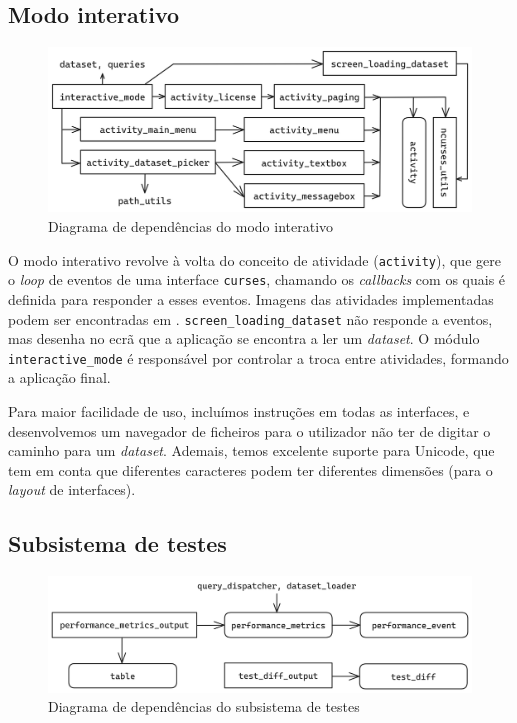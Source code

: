 \documentclass[11pt, a4paper]{article}
\begin{document}
\subsection{Modo interativo}
\label{sec:interactive-mode}

\begin{figure}[ht]
    \centering
    \includegraphics[scale=0.17]{res-fase2/interactive.png}
    \caption{Diagrama de dependências do modo interativo}
    \label{fig:interactive}
\end{figure}

O modo interativo revolve à volta do conceito de atividade (\texttt{activity}), que gere o
\emph{loop} de eventos de uma interface \texttt{curses}, chamando os \emph{callbacks} com os quais
é definida para responder a esses eventos. Imagens das atividades implementadas podem ser
encontradas em . \texttt{screen\_loading\_dataset} não responde
a eventos, mas desenha no ecrã que a aplicação se encontra a ler um \emph{dataset}. O módulo
\texttt{interactive\_mode} é responsável por controlar a troca entre atividades, formando a
aplicação final.

Para maior facilidade de uso, incluímos instruções em todas as interfaces, e desenvolvemos um
navegador de ficheiros para o utilizador não ter de digitar o caminho para um \emph{dataset}.
Ademais, temos excelente suporte para Unicode, que tem em conta que diferentes caracteres podem ter
diferentes dimensões (para o \emph{layout} de interfaces).

\subsection{Subsistema de testes}
\label{sec:testing-subsystem}

\begin{figure}[ht]
    \centering
    \includegraphics[scale=0.15]{res-fase2/testing.png}
    \caption{Diagrama de dependências do subsistema de testes}
    \label{fig:testing}
\end{figure}
\end{document}
